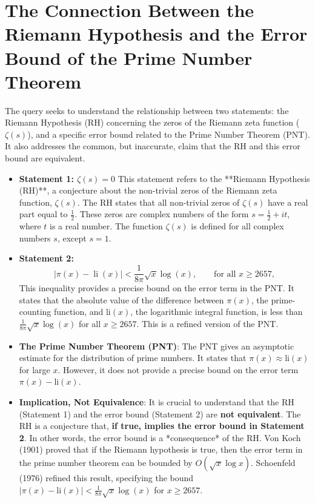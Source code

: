 \documentclass{article}
\begin{document}
\section*{The Connection Between the Riemann Hypothesis and the Error Bound of the Prime Number Theorem}

The query seeks to understand the relationship between two statements: the Riemann Hypothesis (RH) concerning the zeros of the Riemann zeta function (\(\zeta(s)\)), and a specific error bound related to the Prime Number Theorem (PNT). It also addresses the common, but inaccurate, claim that the RH and this error bound are equivalent.

\begin{itemize}
    \item \textbf{Statement 1: \( \zeta(s) = 0 \)} This statement refers to the **Riemann Hypothesis (RH)**, a conjecture about the non-trivial zeros of the Riemann zeta function, \( \zeta(s) \). The RH states that all non-trivial zeros of  \( \zeta(s) \) have a real part equal to \(\frac{1}{2}\). These zeros are complex numbers of the form \( s = \frac{1}{2} + it \), where \( t \) is a real number.  The function  \( \zeta(s) \) is defined for all complex numbers \(s\), except \(s=1\).

    \item \textbf{Statement 2:}  
    \[
    |\pi (x)-\operatorname {li} (x)|<{\frac {1}{8\pi }}{\sqrt {x}}\log(x),\qquad {\text{for all }}x\geq 2657,
    \]
    This inequality provides a precise bound on the error term in the PNT. It states that the absolute value of the difference between \(\pi(x)\), the prime-counting function, and  \(\text{li}(x)\), the logarithmic integral function, is less than  \(\frac{1}{8\pi} \sqrt{x} \log(x)\) for all \(x \geq 2657\). This is a refined version of the PNT.

    \item \textbf{The Prime Number Theorem (PNT)}: The PNT gives an asymptotic estimate for the distribution of prime numbers. It states that \(\pi(x) \approx \text{li}(x)\) for large \(x\). However, it does not provide a precise bound on the error term \( \pi(x) - \text{li}(x) \).

   \item  \textbf{Implication, Not Equivalence}: It is crucial to understand that the RH (Statement 1) and the error bound (Statement 2) are \textbf{not equivalent}. The RH is a conjecture that, \textbf{if true, implies the error bound in Statement 2}. In other words, the error bound is a *consequence* of the RH. Von Koch (1901) proved that if the Riemann hypothesis is true, then the error term in the prime number theorem can be bounded by \( O(\sqrt{x} \log x) \). Schoenfeld (1976) refined this result, specifying the bound \( |\pi(x) - \text{li}(x)| < \frac{1}{8\pi} \sqrt{x} \log(x) \) for \( x \geq 2657 \).
    

\end{itemize}
\end{document}
